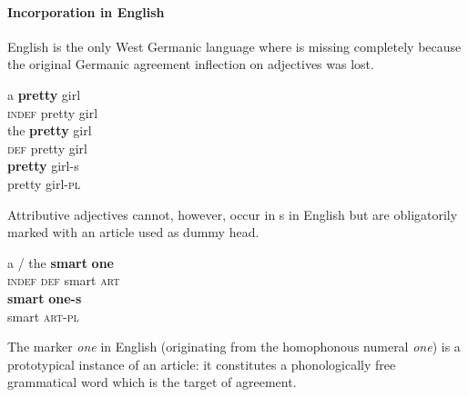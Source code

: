 \paragraph*{Incorporation in English}
English is the only West Germanic language where  is missing completely because the original Germanic agreement inflection on adjectives was lost. 
\begin{exe}
\begin{xlist}
\ex 
\gll	a \textbf{pretty} girl\\
	\textsc{indef} pretty girl\\
\ex
\gll	the \textbf{pretty} girl\\
	\textsc{def} pretty girl\\
\ex 
\gll	\textbf{pretty} girl-s\\
	pretty girl-\textsc{pl}\\
\end{xlist}
\end{exe}
Attributive adjectives cannot, however, occur in s in English but are obligatorily marked with an article used as dummy head.
\begin{exe}
\begin{xlist}
\ex
\gll	a / the \textbf{smart} \textbf{one}\\
	\textsc{indef} {} \textsc{def} smart \textsc{art}\\
\ex	
\gll	\textbf{smart} \textbf{one-s}\\
	smart \textsc{art}-\textsc{pl}\\
\end{xlist}
\end{exe}
The marker \textit{one} in English (originating from the homophonous numeral \textit{one}) is a prototypical instance of an article: it constitutes a phonologically free grammatical word which is the target of agreement. 

